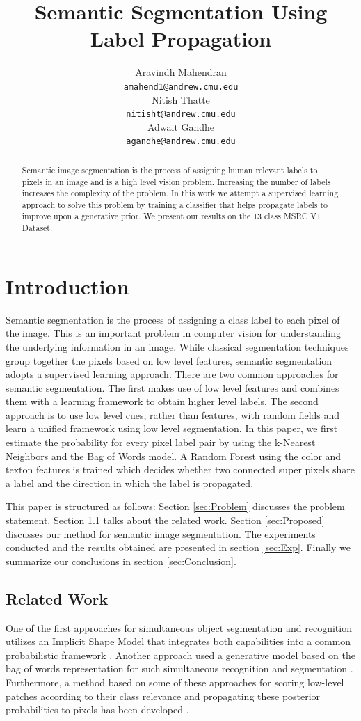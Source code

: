 \documentclass{article} %
\title{Semantic Segmentation Using Label Propagation}
\author{
Aravindh Mahendran \\
\texttt{amahend1@andrew.cmu.edu} \\ 
\And
Nitish Thatte \\
\texttt{nitisht@andrew.cmu.edu} \\
\AND
Adwait Gandhe \\
\texttt{agandhe@andrew.cmu.edu} \\
}
\begin{document}
\maketitle

\begin{abstract}
Semantic image segmentation is the process of assigning human relevant labels to pixels in an image and is a high level vision problem. Increasing the number of labels increases the complexity of the problem. In this work we attempt a supervised learning approach to solve this problem by training a classifier that helps propagate labels to improve upon a generative prior. We present our results on the 13 class MSRC V1 Dataset.
\end{abstract}


\section{Introduction}
Semantic segmentation is the process of assigning a class label to each pixel of the image. This is an important problem in computer vision for understanding the underlying information in an image. While classical segmentation techniques group together the pixels based on low level features, semantic segmentation adopts a supervised learning approach. There are two common approaches for semantic segmentation. The first makes use of low level features and combines them with a learning framework to obtain higher level labels. The second approach is to use low level cues, rather than features, with random fields and learn a unified framework using low level segmentation. In this paper, we first estimate the probability for every pixel label pair by using the k-Nearest Neighbors and the Bag of Words model. A Random Forest \cite{Statistics01randomforests} using the color and texton features is trained which decides whether two connected super pixels share a label and the direction in which the label is propagated. 

This paper is structured as follows: Section \ref{sec:Problem} discusses the problem statement. Section \ref{sec:Related} talks about the related work. Section \ref{sec:Proposed} discusses our method for semantic image segmentation. The experiments conducted and the results obtained are presented in section \ref{sec:Exp}. Finally we summarize our conclusions in section \ref{sec:Conclusion}.
\label{sec:Intro}

\subsection{Related Work}
\label{sec:Related}
One of the first approaches for simultaneous object segmentation and recognition utilizes an Implicit Shape Model that integrates both capabilities into a common probabilistic framework \cite{Leibe04combinedobject}. 
Another approach used a generative model based on the bag of words representation for such simultaneous recognition and segmentation \cite{cao:spatially}.  
Furthermore, a method based on some of these approaches for scoring low-level patches according to their class relevance and propagating these posterior probabilities to pixels has been developed \cite{conf/bmvc/CsurkaP08}.
\end{document}
